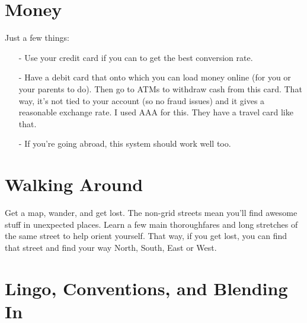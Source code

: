 \documentclass[a4paper,12pt]{scrartcl}
\begin{document}
\newpage

\section{Money}

Just a few things:
\begin{itemize}
   \item[-] Use your credit card if you can to get the best conversion 
      rate.
   \item[-] Have a debit card that onto which you can load money online
      (for you or your parents to do). Then go to ATMs to withdraw
      cash from this card.  That way, it's not tied to your account
      (so no fraud issues) and it gives a reasonable exchange rate.
      I used AAA for this. They have a travel card like that.
   \item[-] If you're going abroad, this system should work well too.
\end{itemize}



\section{Walking Around}

Get a map, wander, and get lost. The non-grid streets mean you'll find
awesome stuff in unexpected places.  Learn a few main thoroughfares and
long stretches of the same street to help orient yourself.  
That way, if you get lost, you can find that street and find your way 
North, South, East or West.




\section{Lingo, Conventions, and Blending In}
\end{document}
